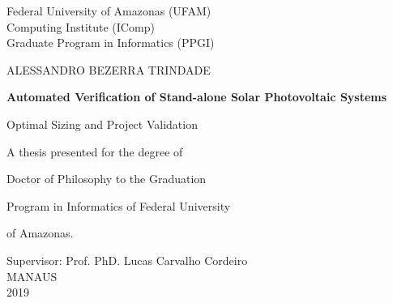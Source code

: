 \begin{titlepage}
    \begin{center}
        \Large
        Federal University of Amazonas (UFAM)\\
        Computing Institute (IComp)\\
		Graduate Program in Informatics (PPGI)\\

        \vspace*{1cm}
        
		\Large
		ALESSANDRO BEZERRA TRINDADE

        \vspace*{2cm}
        		        
        \Huge
        \textbf{Automated Verification of Stand-alone Solar Photovoltaic Systems}
        
        \vspace{0.5cm}
        \LARGE
        Optimal Sizing and Project Validation
        
        \vspace{2cm}
    \end{center}        
    

\hspace{6cm}        A thesis presented for the degree of

\hspace{6cm}        Doctor of Philosophy to the Graduation

\hspace{6cm}        Program in Informatics of Federal University

\hspace{6cm}        of Amazonas.
        
        \vspace{3cm}
        
        \begin{center}
        Supervisor: Prof. PhD. Lucas Carvalho Cordeiro\\
        \vspace{1cm}
        MANAUS\\
        2019\\
        \end{center}
\end{titlepage}
